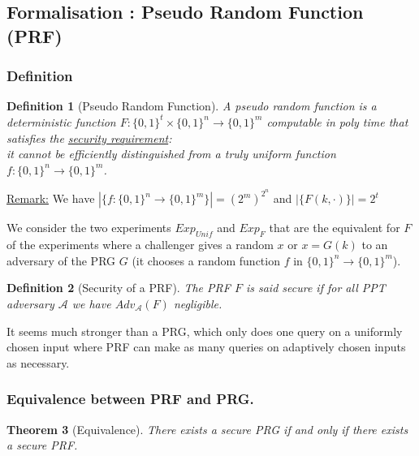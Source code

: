 \documentclass{article}
\newtheorem{thm}{Theorem}[section]
\newtheorem{defi}[thm]{Definition}
\newcommand{\Thm}[3]{\begin{thm}[#1]\label{#2}#3\end{thm}}
\newcommand{\Def}[3]{\begin{defi}[#1]\label{#2}#3\end{defi}}
\newcommand{\Rem}{\underline{Remark:} }
\newcommand{\A}{\mathcal{A}}
\newcommand{\bit}{\{0,1\}}
\begin{document}
\subsection{Formalisation : Pseudo Random Function (PRF)}
\subsubsection{Definition}
\Def{Pseudo Random Function}{def:PRF}{A pseudo random function is a deterministic function $F:\bit^t\times\bit^n\rightarrow\bit^m$ computable in poly time that satisfies the \underline{security requirement}:\\
it cannot be efficiently distinguished from a truly uniform function $f:\bit^n\rightarrow\bit^m$.}

\Rem We have $|\{f:\bit^n\rightarrow\bit^m\}|=(2^m)^{2^n}$ and $|\{F(k,\cdot)\}|=2^t$

We consider the two experiments $Exp_{Unif}$ and $Exp_F$ that are the equivalent for $F$ of the experiments where a challenger gives a random $x$ or $x=G(k)$ to an adversary of the PRG $G$ (it chooses a random function $f$ in $\bit^n\rightarrow\bit^m$). 

\begin{center}
\end{center}

\Def{Security of a PRF}{def securePRF}{The PRF $F$ is said secure if for all PPT adversary $\A$ we have $Adv_\A(F)$ negligible.} 

It seems much stronger than a PRG, which only does one query on a uniformly chosen input where PRF can make as many queries on adaptively chosen inputs as necessary.

\subsubsection{Equivalence between PRF and PRG.}
\Thm{Equivalence}{thm:equivPRGPRF}{There exists a secure PRG if and only if there exists a secure PRF.}
\end{document}
